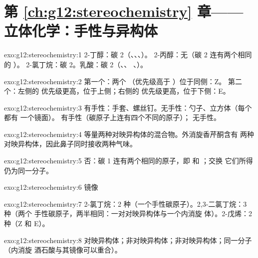 \section*{第 \ref{ch:g12:stereochemistry} 章——立体化学：手性与异构体}

\begin{solution}{exo:g12:stereochemistry:1}
2-丁醇：碳 2（、、、）。
2-丙醇：无（碳 2 连有两个相同的 ）。
2-氯丁烷：碳 2。乳酸：碳 2（、、
、）。
\end{solution}

\begin{solution}{exo:g12:stereochemistry:2}
第一个：两个 （优先级高于 ）位于同侧：Z。
第二个：左侧的  优先级更高，位于上侧；右侧的
 优先级更高，位于下侧：E。
\end{solution}

\begin{solution}{exo:g12:stereochemistry:3}
有手性：手套、螺丝钉。无手性：勺子、立方体（每个都有
一个镜面）。 有手性（碳原子上连有四个不同的原子）；
 无手性。
\end{solution}

\begin{solution}{exo:g12:stereochemistry:4}
等量两种对映异构体的混合物。外消旋香芹酮含有
两种对映异构体，因此鼻子同时接收两种气味。
\end{solution}

\begin{solution}{exo:g12:stereochemistry:5}
否：碳 1 连有两个相同的原子，即  和 ；交换
它们所得仍为同一分子。
\end{solution}

\begin{solution}{exo:g12:stereochemistry:6}
 \quad 镜像
\quad {}
\end{solution}

\begin{solution}{exo:g12:stereochemistry:7}
2-氯丁烷：2 种（一个手性碳原子）。2,3-二氯丁烷：3 种（两个
手性碳原子，两半相同：一对对映异构体与一个内消旋
体）。2-戊烯：2 种（Z 和 E）。
\end{solution}

\begin{solution}{exo:g12:stereochemistry:8}
对映异构体；非对映异构体；非对映异构体；同一分子（内消旋
酒石酸与其镜像可以重合）。
\end{solution}

